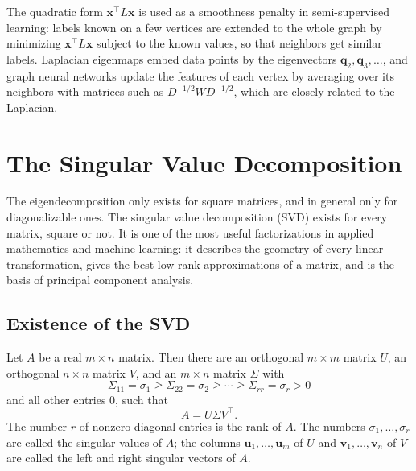 \begin{remark}
    The quadratic form $\mathbf{x}^\top L\mathbf{x}$ is used as a smoothness penalty in semi-supervised learning: labels known on a few vertices are extended to the whole graph by minimizing $\mathbf{x}^\top L\mathbf{x}$ subject to the known values, so that neighbors get similar labels. Laplacian eigenmaps embed data points by the eigenvectors $\mathbf{q}_2, \mathbf{q}_3, \ldots$, and graph neural networks update the features of each vertex by averaging over its neighbors with matrices such as $D^{-1/2}WD^{-1/2}$, which are closely related to the Laplacian.
\end{remark}

\section{The Singular Value Decomposition}\label{L2-sec:svd}

The eigendecomposition only exists for square matrices, and in general only for diagonalizable ones. The singular value decomposition (SVD) exists for every matrix, square or not. It is one of the most useful factorizations in applied mathematics and machine learning: it describes the geometry of every linear transformation, gives the best low-rank approximations of a matrix, and is the basis of principal component analysis.

\subsection{Existence of the SVD}

\begin{theorem}\label{L2-thm:svd}
    Let $A$ be a real $m \times n$ matrix. Then there are an orthogonal $m \times m$ matrix $U$, an orthogonal $n \times n$ matrix $V$, and an $m \times n$ matrix $\Sigma$ with
    \[\Sigma_{11} = \sigma_1 \geq \Sigma_{22} = \sigma_2 \geq \cdots \geq \Sigma_{rr} = \sigma_r > 0\]
    and all other entries $0$, such that
    \[A = U \Sigma V^\top.\]
    The number $r$ of nonzero diagonal entries is the rank of $A$. The numbers $\sigma_1, \ldots, \sigma_r$ are called the singular values of $A$; the columns $\mathbf{u}_1, \ldots, \mathbf{u}_m$ of $U$ and $\mathbf{v}_1, \ldots, \mathbf{v}_n$ of $V$ are called the left and right singular vectors of $A$.
\end{theorem}

